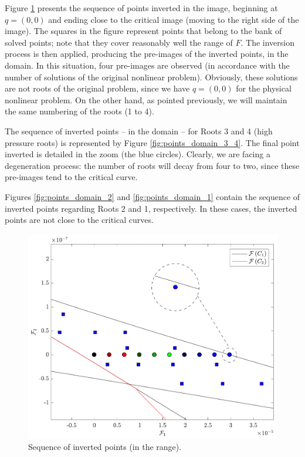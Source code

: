 \documentclass{article}
\theoremstyle{definition}
\theoremstyle{remark}
\begin{document}
Figure \ref{fig:points_image} presents the sequence of points inverted in the image, beginning at $q = \left(0,0\right)$ and ending close to the critical image (moving to the right side of the image). The squares in the figure represent points that belong to
 the bank of solved points; note that they cover reasonably well the range of $F$. The inversion process is then applied, producing the pre-images of the inverted points, in the domain. In this situation, four pre-images are observed (in accordance with the number of solutions of the original nonlinear problem). Obviously, these solutions are not roots of the original problem, since we have $q = (0,0)$ for the physical nonlinear problem. On the other hand, as pointed previously, we will maintain the same numbering of the roots (1 to 4).

The sequence of inverted points -- in the domain -- for Roots 3 and 4 (high pressure roots) is represented by Figure \ref{fig:points_domain_3_4}. The final point inverted is detailed in the zoom (the blue circles). Clearly, we are facing a degeneration process: the number of roots will decay from four to two, since these pre-images tend to the critical curve.

Figures \ref{fig:points_domain_2} and \ref{fig:points_domain_1}
  contain the sequence of inverted points regarding Roots 2 and 1, respectively. In these cases, the inverted points are not close to the critical curves.

\begin{figure}
	\begin{center}
		\includegraphics[scale=0.50]{sequencia_pontos_imagem.pdf}
		\caption{Sequence of inverted points (in the range).}\label{fig:points_image}
	\end{center}
\end{figure}
\end{document}
